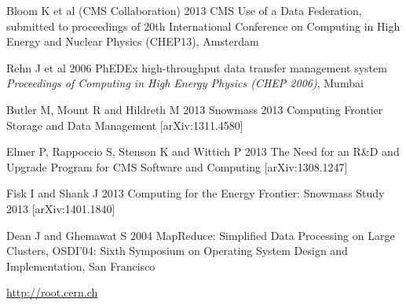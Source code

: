 \documentclass[a4paper]{jpconf}
\begin{document}
\begin{thebibliography}{9}
 Bloom K et al (CMS Collaboration) 2013 CMS Use of
  a Data Federation, submitted to proceedings of 20th International
  Conference on Computing in High Energy and Nuclear Physics (CHEP13),
  Amsterdam

 Rehn J et al 2006 PhEDEx high-throughput data
  transfer management system {\it Proceedings of Computing in High
    Energy Physics (CHEP 2006)}, Mumbai

 Butler M, Mount R and Hildreth M 2013 Snowmass
  2013 Computing Frontier Storage and Data Management
  [arXiv:1311.4580]

 Elmer P, Rappoccio S, Stenson K and Wittich P 2013
  The Need for an R\&D and Upgrade Program for CMS Software and
  Computing [arXiv:1308.1247]

 Fisk I and Shank J 2013 Computing for the Energy
  Frontier: Snowmass Study 2013 [arXiv:1401.1840]

 Dean J and Ghemawat S 2004 MapReduce: Simplified Data Processing on Large Clusters, OSDI'04: Sixth Symposium on Operating System Design
and Implementation, San Francisco

 \url{http://root.cern.ch}

\end{thebibliography}
\end{document}
